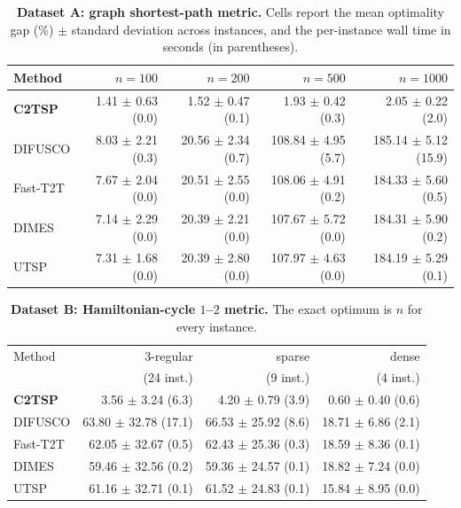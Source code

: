\begin{table}[h]
\centering
\caption{\textbf{Dataset A: graph shortest-path metric.} Cells report the mean optimality gap (\%) $\pm$ standard deviation across instances, and the per-instance wall time in seconds (in parentheses). 
}
\label{tab:dataset-a}
\small
\setlength{\tabcolsep}{5pt}
\begin{tabular}{lrrrr}
\toprule
Method & $n=100$ & $n=200$ & $n=500$ & $n=1000$  \\
\midrule
\textbf{C2TSP} & 1.41 $\pm$ 0.63 (0.0) & 1.52 $\pm$ 0.47 (0.1) & 1.93 $\pm$ 0.42 (0.3) & 2.05 $\pm$ 0.22 (2.0)  \\
DIFUSCO & 8.03 $\pm$ 2.21 (0.3) & 20.56 $\pm$ 2.34 (0.7) & 108.84 $\pm$ 4.95 (5.7) & 185.14 $\pm$ 5.12 (15.9) \\
Fast-T2T & 7.67 $\pm$ 2.04 (0.0) & 20.51 $\pm$ 2.55 (0.0) & 108.06 $\pm$ 4.91 (0.2) & 184.33 $\pm$ 5.60 (0.5)  \\
DIMES & 7.14 $\pm$ 2.29 (0.0) & 20.39 $\pm$ 2.21 (0.0) & 107.67 $\pm$ 5.72 (0.0) & 184.31 $\pm$ 5.90 (0.2)  \\
UTSP & 7.31 $\pm$ 1.68 (0.0) & 20.39 $\pm$ 2.80 (0.0) & 107.97 $\pm$ 4.63 (0.0) & 184.19 $\pm$ 5.29 (0.1)  \\
\bottomrule
\end{tabular}
\end{table}

\begin{table}[h]
\centering
\caption{\textbf{Dataset B: Hamiltonian-cycle $1$--$2$ metric.} The exact optimum is $n$ for every instance.}
\label{tab:dataset-b}
\small
\setlength{\tabcolsep}{7pt}
\begin{tabular}{lrrr}
\toprule
Method & $3$-regular & sparse & dense \\
 & \footnotesize(24 inst.) & \footnotesize(9 inst.) & \footnotesize(4 inst.) \\
\midrule
\textbf{C2TSP} & 3.56 $\pm$ 3.24 (6.3) & 4.20 $\pm$ 0.79 (3.9) & 0.60 $\pm$ 0.40 (0.6) \\
DIFUSCO & 63.80 $\pm$ 32.78 (17.1) & 66.53 $\pm$ 25.92 (8.6) & 18.71 $\pm$ 6.86 (2.1) \\
Fast-T2T & 62.05 $\pm$ 32.67 (0.5) & 62.43 $\pm$ 25.36 (0.3) & 18.59 $\pm$ 8.36 (0.1) \\
DIMES & 59.46 $\pm$ 32.56 (0.2) & 59.36 $\pm$ 24.57 (0.1) & 18.82 $\pm$ 7.24 (0.0) \\
UTSP & 61.16 $\pm$ 32.71 (0.1) & 61.52 $\pm$ 24.83 (0.1) & 15.84 $\pm$ 8.95 (0.0) \\
\bottomrule
\end{tabular}
\end{table}

